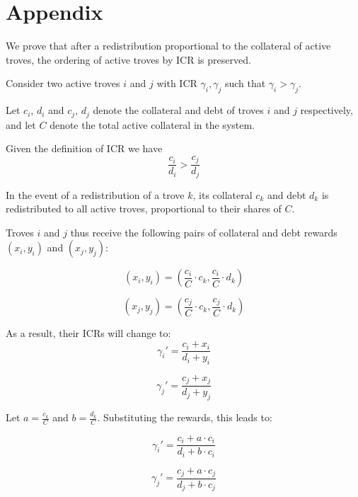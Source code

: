 \documentclass[reqno]{article}
\begin{document}
\pagebreak
\section{Appendix} \label{eq:appendix}
We prove that after a redistribution proportional to the collateral of active troves, the ordering of active troves by ICR is preserved. 

Consider two active troves $i$ and $j$ with ICR $\gamma_i,  \gamma_j$ such that $\gamma_i > \gamma_j$.

Let $c_i$, $d_i$ and $c_j$, $d_j$ denote the collateral and debt of troves $i$ and $j$ respectively, and let $C$ denote the total active collateral in the system.

Given the definition of ICR we have 
\begin{equation} \label{eq:92}
    \frac{c_i}{d_i}>\frac{c_j}{d_j}
\end{equation}

In the event of a redistribution of a trove $k$, its collateral $c_k$ and debt $d_k$ is redistributed to all active troves, proportional to their shares of $C$.

Troves $i$ and $j$ thus receive the following pairs of collateral and debt rewards $(x_i, y_i)$ and $(x_j, y_j)$:

\begin{equation} 
  (x_i, y_i) = \left(\frac{c_i}{C} \cdot c_k, \frac{c_i}{C} \cdot d_k\right)
\end{equation}

\begin{equation} 
   (x_j, y_j) = \left(\frac{c_j}{C} \cdot c_k, \frac{c_j}{C} \cdot d_k\right)
\end{equation}

As a result, their ICRs will change to:
\begin{equation} 
  \gamma_i' = \frac{c_i + x_i}{d_i + y_i} 
\end{equation}

\begin{equation} 
  \gamma_j' = \frac{c_j + x_j}{d_j + y_j} 
\end{equation}

Let $a = \frac{c_k}{C}$ and $b = \frac{d_k}{C}$. Substituting the rewards, this leads to:

\begin{equation} \label{eq:97}
  \gamma_i' = \frac{c_i + a \cdot c_i}{d_i + b \cdot c_i} 
\end{equation}

\begin{equation} \label{eq:98}
  \gamma_j' = \frac{c_j + a \cdot c_j}{d_j + b \cdot c_j} 
\end{equation}
\end{document}
